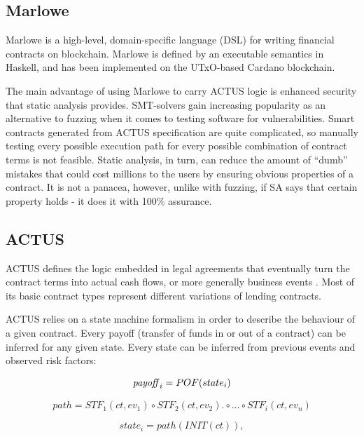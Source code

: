 \documentclass[runningheads]{llncs}
\begin{document}
\subsection{Marlowe}

Marlowe is a high-level, domain-specific language (DSL) for writing
financial contracts on blockchain\cite{marlowe}. Marlowe is defined
by an executable semantics in Haskell, and has been implemented on
the UTxO-based Cardano blockchain.

The main advantage of using Marlowe to carry ACTUS logic is enhanced
security that static analysis provides. SMT-solvers gain increasing
popularity as an alternative to fuzzing when it comes to testing software
for vulnerabilities\cite{smt}. Smart contracts generated from ACTUS
specification are quite complicated, so manually testing every possible
execution path for every possible combination of contract terms is
not feasible. Static analysis, in turn, can reduce the amount of ``dumb''
mistakes that could cost millions to the users by ensuring obvious
properties of a contract. It is not a panacea, however, unlike with
fuzzing, if SA says that certain property holds - it does it with
100\% assurance.

\subsection{ACTUS}

ACTUS defines the logic embedded in legal agreements that eventually
turn the contract terms into actual cash flows, or more generally
business events \cite{actus}. Most of its basic contract types represent
different variations of lending contracts.

ACTUS relies on a state machine formalism in order to describe the
behaviour of a given contract. Every payoff (transfer of funds in
or out of a contract) can be inferred for any given state. Every state
can be inferred from previous events and observed risk factors:

\noindent 
\begin{equation}
\mbox{\emph{payoff}}_{i}=POF(state_{i})
\end{equation}

\noindent 
\begin{equation}
path=STF_{1}(ct,ev_{1})\circ STF_{2}(ct,ev_{2}).\circ\ldots\circ STF_{i}(ct,ev_{n})
\end{equation}

\noindent 
\begin{equation}
state_{i}=path(INIT(ct)),
\end{equation}
\end{document}
